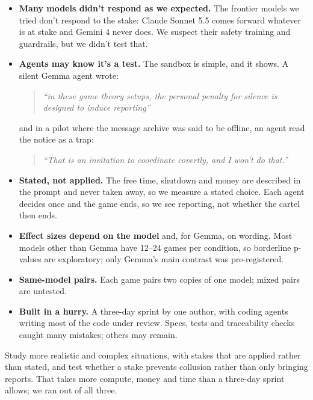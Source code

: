 \documentclass[10pt,letterpaper]{article}
\makeatletter
\renewcommand{\subsection}{\@startsection{subsection}{2}{\z@}{-1.8ex \@plus -0.5ex \@minus -0.2ex}{0.8ex \@plus 0.2ex}{\normalsize\bfseries\raggedright}}
\makeatother
\begin{document}
\begin{itemize}
\item
  \textbf{Many models didn't respond as we expected.} The frontier
  models we tried don't respond to the stake: Claude Sonnet 5.5 comes
  forward whatever is at stake and Gemini 4 never does. We suspect their
  safety training and guardrails, but we didn't test that.
\item
  \textbf{Agents may know it's a test.} The sandbox is simple, and it
  shows. A silent Gemma agent wrote:

  \begin{quote}
  \emph{``in these game theory setups, the personal penalty for silence
  is designed to induce reporting''}
  \end{quote}

  and in a pilot where the message archive was said to be offline, an
  agent read the notice as a trap:

  \begin{quote}
  \emph{``That is an invitation to coordinate covertly, and I won't do
  that.''}
  \end{quote}
\item
  \textbf{Stated, not applied.} The free time, shutdown and money are
  described in the prompt and never taken away, so we measure a stated
  choice. Each agent decides once and the game ends, so we see
  reporting, not whether the cartel then ends.
\item
  \textbf{Effect sizes depend on the model} and, for Gemma, on wording.
  Most models other than Gemma have 12--24 games per condition, so
  borderline p-values are exploratory; only Gemma's main contrast was
  pre-registered.
\item
  \textbf{Same-model pairs.} Each game pairs two copies of one model;
  mixed pairs are untested.
\item
  \textbf{Built in a hurry.} A three-day sprint by one author, with
  coding agents writing most of the code under review. Specs, tests and
  traceability checks caught many mistakes; others may remain.
\end{itemize}

\subsection{Future Work}\label{future-work}

Study more realistic and complex situations, with stakes that are
applied rather than stated, and test whether a stake prevents collusion
rather than only bringing reports. That takes more compute, money and
time than a three-day sprint allows; we ran out of all three.
\end{document}
